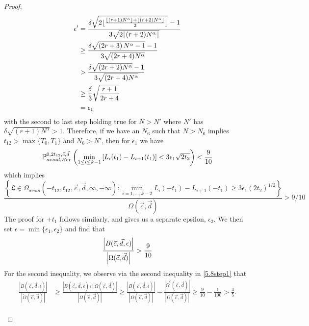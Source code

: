 \begin{proof}
	\begin{align*}
	\epsilon'
	&=\frac{\delta\sqrt{2\floor{\frac{\floor{(r+1)N^\alpha}+\floor{(r+2)N^\alpha}}2}}-1}{3\sqrt{2\floor{(r+2)N^\alpha}}}\\
	&\geq\frac{\delta\sqrt{\left(2r+3\right)N^\alpha-1}-1}{3\sqrt{(2r+4)N^\alpha}}\\
	&>\frac{\delta\sqrt{(2r+2)N^\alpha}-1}{3\sqrt{(2r+4)N^\alpha}}\\
	&\geq\frac{\delta}{3}\sqrt{\frac{r+1}{2r+4}}\\
	&=\epsilon_1
	\end{align*}
	with the second to last step holding true for $N>N'$ where $N'$ has $\delta\sqrt{(r+1)N^\alpha}>1$. Therefore, if we have an $N_6$ such that $N>N_6$ implies $t_{12}>\max\{T_0,T_1\}$ and $N_6>N'$, then for $\epsilon_1$ we have
	\[
	\pr^{0,2t_{12},\vec c, \vec d}_{avoid,Ber}\left(\min_{1\leq i\leq k-1} \left[L_i(t_1)-L_{i+1}(t_1)\right]<3\epsilon_1\sqrt{2t_2}\right)<\frac{9}{10}
	\]
	which implies
	$$\frac{\left\{ \mathfrak{L} \in \Omega_{avoid}(-t_{12}, t_{12}, \vec{c}, \vec{d}, \infty, -\infty): \min_{i = 1, \dots, k-2} L_{i}(- t_1) - L_{i+1}(-t_1) \geq 3\epsilon_1 (2t_2)^{1/2} \right\}}{\Omega(\vec c,\vec d)}>9/10$$ The proof for $+t_1$ follows similarly, and gives us a separate epsilon, $\epsilon_2$. We then set $\epsilon=\min\{\epsilon_1,\epsilon_2\}$ and find that $$\frac{\abs*{B(\vec c, \vec d, \epsilon)}}{\abs*{\Omega(\vec c, \vec d)}}>\frac{9}{10}$$ 
	For the second inequality, we observe via the second inequality in \eqref{5.8step1} that
	\begin{align*}
	\frac{|\tilde{B}(\vec{c},\vec{d},\epsilon)|}{|\tilde{\Omega}(\vec{c},\vec{d})|} &\geq \frac{|B(\vec{c},\vec{d},\epsilon)\cap\tilde{\Omega}(\vec{c},\vec{d})|}{|\Omega(\vec{c},\vec{d})|} \geq \frac{|B(\vec{c},\vec{d},\epsilon)|}{|\Omega(\vec{c},\vec{d})|} -\frac{|\tilde{\Omega}^c(\vec{c},\vec{d})|}{|\Omega(\vec{c},\vec{d})|} \geq \frac{9}{10} - \frac{1}{100} > \frac{4}{5}.
	\end{align*} \\
	

\end{proof}
